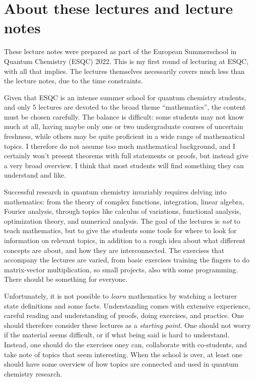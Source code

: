 \chapter*{About these lectures and lecture notes}

These lecture notes were prepared as part of the European Summerschool in Quantum Chemistry (ESQC) 2022. This is my first round of lecturing at ESQC, with all that implies. The lectures themselves necessarily covers much less than the lecture notes, due to the time constraints. 

Given that ESQC is an intense summer school for quantum chemistry students, and only 5 lectures are devoted to the broad theme ``mathematics'', the content must be chosen carefully. The balance is difficult: some students may not know much at all, having maybe only one or two undergraduate courses of uncertain freshness, while others may be quite proficient in a wide range of mathematical topics. I therefore do not assume too much mathematical background, and I certainly won't present theorems with full statements or proofs, but instead give a very broad overview. I think that most students  will find something they can understand and like.


Successful research in quantum chemistry invariably requires delving into mathematics: from the theory of complex functions, integration, linear algebra, Fourier analysis, through topics like calculus of variations, functional analysis, optimization theory, and numerical analysis. The goal of the lectures is \emph{not} to teach mathematics, but to give the students some tools for where to look for information on relevant topics, in addition to a rough idea about what different concepts are about, and how they are interconnected. The exercises that accompany the lectures are varied, from basic exercises training the fingers to do matrix-vector multiplication, so small projects, also with some programming. There should be something for everyone.

Unfortunately, it is not possible to \emph{learn} mathematics by watching a lecturer state definitions and some facts. Understanding comes with extensive experience, careful reading and understanding of proofs, doing exercises, and practice. One should therefore consider these lectures as a \emph{starting point}. One should not  worry if the material seems difficult, or if what being said is hard to understand. Instead, one should do the exercises oney can, collaborate with co-students, and take note of topics that seem interesting. When the school is over, at least one should have some overview of how topics are connected and used in quantum chemistry research.
